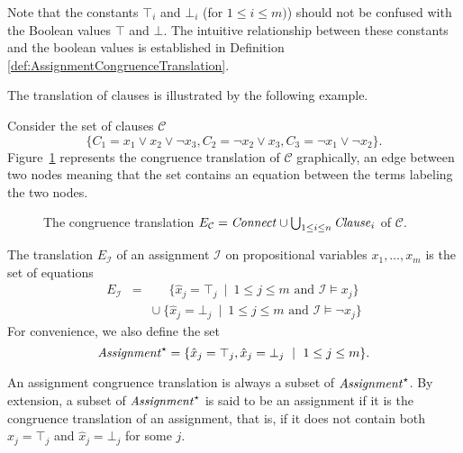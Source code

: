 \documentclass[smallextended]{svjour3}
\begin{document}
\begin{remark}
Note that the constants $\top_i$ and $\bot_i$ (for $1 \leq i \leq m)$) should not be confused with the Boolean values $\top$ and $\bot$. The intuitive relationship between these constants and the boolean values is established in Definition \ref{def:AssignmentCongruenceTranslation}.
\end{remark}


\noindent The translation of clauses is illustrated by the following example.

\begin{example}\label{ex:np1}
Consider the set of clauses $\mathcal{C}$
\begin{equation*}
\big\{C_1 = x_1 \vee x_2 \vee \neg x_3, C_2 = \neg x_2 \vee x_3, C_3 = \neg x_1 \vee \neg x_2\big\}.
\end{equation*}
Figure~\ref{fig:npexamplebig} represents the congruence translation of
$\mathcal{C}$ graphically, an edge between two nodes meaning that the set
contains an equation between the terms labeling the two nodes.

\begin{figure}[htb]

\caption{The congruence translation $E_{\mathcal{C}} = {\it Connect} \cup \bigcup_{1 \leq i \leq n}{\it Clause}_i$ of $\mathcal{C}$.}
\label{fig:npexamplebig}
\end{figure}

\end{example}

\begin{definition}
\label{def:AssignmentCongruenceTranslation}
  The translation $E_{\mathcal{I}}$ of an assignment $\mathcal{I}$ on propositional variables $x_1,\ldots,x_m$ is the set of equations
\begin{eqnarray*}
  E_{\mathcal{I}} & = & \phantom{\cup}\ \{ \hat{x}_j = \top_j \ \mid\  1 \leq j \leq m \text{ and } \mathcal{I} \models x_j \} \\
               &   & \cup\ \{ \hat{x}_j = \bot_j \ \mid\ 1 \leq j \leq m \text{ and } \mathcal{I} \models \neg x_j \}
\end{eqnarray*}
For convenience, we also define the set
\begin{equation*}
  {\it Assignment}^\star = \{ \hat{x}_j = \top_j, \hat{x}_j = \bot_j \ \mid\ 1 \leq j \leq m\}.
\end{equation*}
\end{definition}
\noindent
An assignment congruence translation is always a subset of
${\it Assignment}^\star$.  By extension, a subset of ${\it Assignment}^\star$ is
said to be an assignment if it is the congruence translation of an assignment,
that is, if it does not contain both $\hat{x}_j = \top_j$ and $\hat{x}_j =
\bot_j$ for some $j$.
\end{document}
